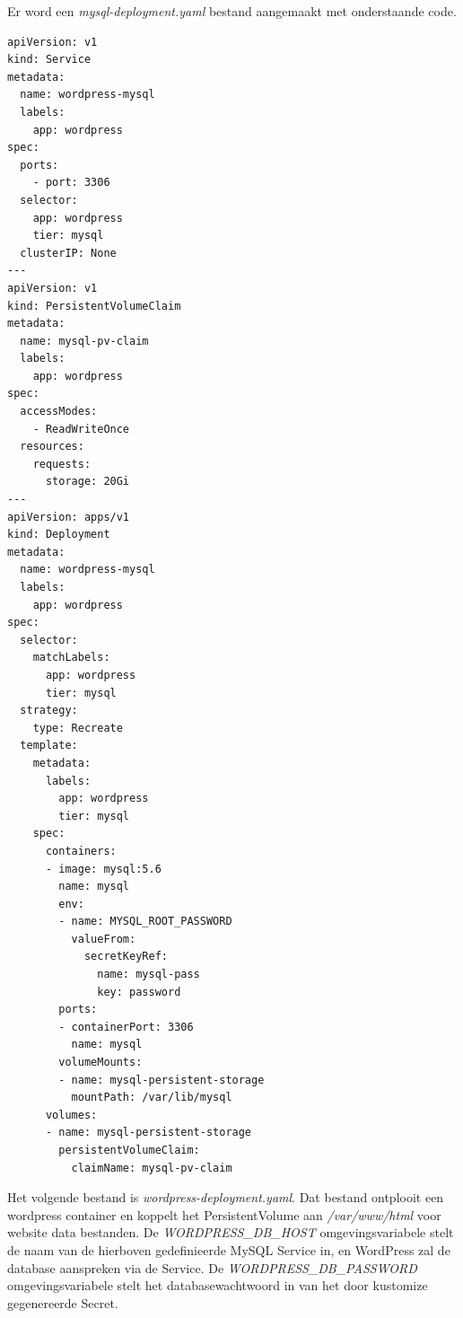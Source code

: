 Er word een \textit{mysql-deployment.yaml} bestand aangemaakt met onderstaande code.
\begin{lstlisting}[language=tex, caption={Configuratie mysql}]
apiVersion: v1
kind: Service
metadata:
  name: wordpress-mysql
  labels:
    app: wordpress
spec:
  ports:
    - port: 3306
  selector:
    app: wordpress
    tier: mysql
  clusterIP: None
---
apiVersion: v1
kind: PersistentVolumeClaim
metadata:
  name: mysql-pv-claim
  labels:
    app: wordpress
spec:
  accessModes:
    - ReadWriteOnce
  resources:
    requests:
      storage: 20Gi
---
apiVersion: apps/v1
kind: Deployment
metadata:
  name: wordpress-mysql
  labels:
    app: wordpress
spec:
  selector:
    matchLabels:
      app: wordpress
      tier: mysql
  strategy:
    type: Recreate
  template:
    metadata:
      labels:
        app: wordpress
        tier: mysql
    spec:
      containers:
      - image: mysql:5.6
        name: mysql
        env:
        - name: MYSQL_ROOT_PASSWORD
          valueFrom:
            secretKeyRef:
              name: mysql-pass
              key: password
        ports:
        - containerPort: 3306
          name: mysql
        volumeMounts:
        - name: mysql-persistent-storage
          mountPath: /var/lib/mysql
      volumes:
      - name: mysql-persistent-storage
        persistentVolumeClaim:
          claimName: mysql-pv-claim
\end{lstlisting}

Het volgende bestand is \textit{wordpress-deployment.yaml}. Dat bestand ontplooit een wordpress container en koppelt het PersistentVolume aan \textit{/var/www/html} voor website data bestanden. De \textit{WORDPRESS\_DB\_HOST} omgevingsvariabele stelt de naam van de hierboven gedefinieerde MySQL Service in, en WordPress zal de database aanspreken via de Service. De \textit{WORDPRESS\_DB\_PASSWORD} omgevingsvariabele stelt het databasewachtwoord in van het door kustomize gegenereerde Secret.

